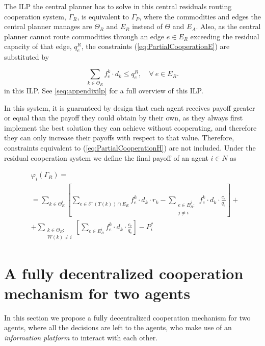 \documentclass[authoryear]{elsarticle}
\begin{document}
The ILP the central planner has to solve in this central residuals routing cooperation system, $\Gamma_R$, is equivalent to $\Gamma_P$, where the commodities and edges the central planner manages are $\Theta_R$ and $E_R$ instead of $\Theta$ and $E_A$. Also, as the central planner cannot route commodities through an edge $e\in E_R$ exceeding the residual capacity of that edge, $q_e^R$, the constraints (\ref{eq:PartialCooperationE}) are substituted by

\begin{equation}
\sum_{k \in \Theta_R} f_e^k\cdot d_k \leq q_e^R,\quad \forall\ e \in E_R.
\end{equation}
in this ILP. See \ref{seq:appendixilp} for a full overview of this ILP.
    
In this system, it is guaranteed by design that each agent receives  payoff greater or equal than the payoff they could obtain by their own, as they always first implement the best solution they can achieve without cooperating, and therefore they can only increase their payoffs with respect to that value. Therefore, constraints equivalent to (\ref{eq:PartialCooperationH}) are not included. Under the residual cooperation system we define the final payoff of an agent $i\in N$ as

\begin{equation}
    \begin{split}
    & \varphi_i(\Gamma_R) =\label{eq:ResidualCooperationPayoff} \\
    & = \sum_{k\in \Theta^i_R} \left[ \sum_{e \in \delta^-(T(k))\cap E_R} f_e^k \cdot d_k \cdot r_k -  \sum_{\substack{e\in E^j_R \colon\\ j\not = i}} f_e^k \cdot d_k \cdot \frac{c_e}{q_e} \right] + \\
    & + \sum_{\substack{k \in \Theta_R  \colon \\ W(k) \not = i}} \left[\sum_{e \in E_R^i} f_e^k \cdot d_k \cdot \frac{c_e}{q_e}\right] - P_i^*
    \end{split}
\end{equation}


\section{A fully decentralized cooperation mechanism for two agents} \label{seq:itermodel}

In this section we propose a fully decentralized cooperation mechanism for two agents, where all the decisions are left to the agents, who make use of an \emph{information platform} to interact with each other.
\end{document}
